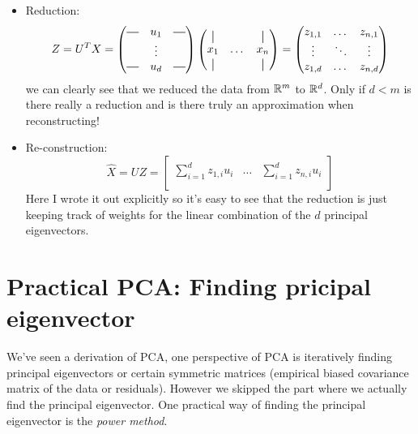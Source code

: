 \begin{itemize}
 	\item Reduction: 
 	\begin{equation}
 	Z 
 	= U^T X
 	= 
 	\begin{pmatrix}
 	\horzbar & u_1 & \horzbar\\
 	 & \vdots & \\
 	\horzbar & u_d & \horzbar\\
 	\end{pmatrix}
 	\begin{pmatrix}
 	\vertbar & & \vertbar \\
 	x_1 & \dots & x_n\\
 	\vertbar & & \vertbar \\
 	\end{pmatrix} 
 	= 
 	\begin{pmatrix}
 	z_{1,1} & \dots& z_{n,1}\\
 	\vdots& \ddots & \vdots\\
 	z_{1,d} & \dots & z_{n,d}\\
 	\end{pmatrix}
 	\end{equation}
we can clearly see that we reduced the data from $\mathbb{R}^m$ 
to $\mathbb{R}^d$. Only if $d < m$ is there really a reduction 
and is there truly an approximation when reconstructing!
 	\item Re-construction:
 	\begin{equation}
 	\hat{X} = UZ = \begin{bmatrix} 
 	\sum_{i=1}^{d}z_{1,i}u_i & \dots & \sum_{i=1}^{d}z_{n,i}u_i \\
 	\end{bmatrix}
 	\end{equation}
Here I wrote it out explicitly so it's easy to see that 
the reduction is just keeping track of weights for the 
linear combination of the $d$ principal eigenvectors.
\end{itemize}
		 
\section{Practical PCA: Finding pricipal eigenvector}
We've seen a derivation of PCA, one perspective of PCA 
is iteratively finding principal eigenvectors or certain 
symmetric matrices (empirical biased covariance matrix of 
the data or residuals). However we skipped the part where 
we actually find the principal eigenvector. One practical 
way of finding the principal eigenvector is the 
\textit{power method}.

